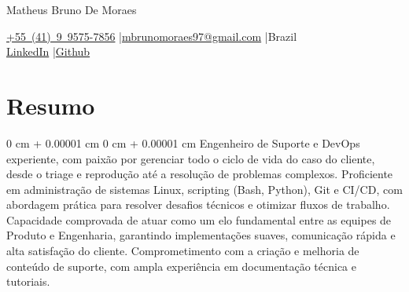 \documentclass[10pt, letterpaper]{article}
\newenvironment{onecolentry}{
    \begin{adjustwidth}{
        0 cm + 0.00001 cm
    }{
        0 cm + 0.00001 cm
    }
}{
    \end{adjustwidth}
}
\newenvironment{header}{
    \setlength{\topsep}{0pt}\par\kern\topsep\centering\linespread{1.5}
}{
    \par\kern\topsep
}
\begin{document}
\begin{header}
    {\fontsize{25pt}{25pt}\selectfont Matheus Bruno De Moraes}

    \vspace{0pt}

    \normalsize
    \mbox{\href{tel:+55(41)995757856}{+55 (41) 9 9575-7856}} \enskip|\enskip \mbox{\href{mailto:mbrunomoraes97@gmail.com}{mbrunomoraes97@gmail.com}} \enskip|\enskip \mbox{Brazil} \\
    \mbox{\href{https://www.linkedin.com/in/brunomoraes97/}{LinkedIn}} \enskip|\enskip \mbox{\href{https://github.com/brunomoraes97}{Github}}
\end{header}

\vspace{5pt - 0.1cm}

\section{Resumo}
\begin{onecolentry}{Engenheiro de Suporte e DevOps experiente, com paixão por gerenciar todo o ciclo de vida do caso do cliente, desde o triage e reprodução até a resolução de problemas complexos. Proficiente em administração de sistemas Linux, scripting (Bash, Python), Git e CI/CD, com abordagem prática para resolver desafios técnicos e otimizar fluxos de trabalho. Capacidade comprovada de atuar como um elo fundamental entre as equipes de Produto e Engenharia, garantindo implementações suaves, comunicação rápida e alta satisfação do cliente. Comprometimento com a criação e melhoria de conteúdo de suporte, com ampla experiência em documentação técnica e tutoriais.}\end{onecolentry}
\end{document}
